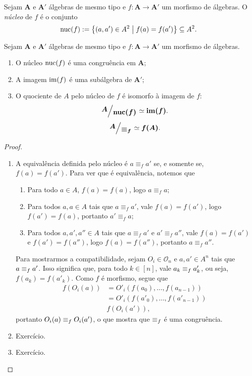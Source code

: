 \begin{definition}
Sejam $\bm A$ e $\bm A'$ álgebras de mesmo tipo e $f\colon \bm A \to \bm A'$ um morfismo de álgebras. O \emph{núcleo} de $f$ é o conjunto
		\begin{equation*}
			\operatorname{nuc}(f) := \left\{{(a,a') \in A^2}\;\middle\vert\;{f(a) = f(a')}\right\} \subseteq A^2.
		\end{equation*}
\end{definition}

\begin{proposition}
Sejam $\bm A$ e $\bm A'$ álgebras de mesmo tipo e $f\colon \bm A \to \bm A'$ um morfismo de álgebras.
	\begin{enumerate}
		\item O núcleo $\operatorname{nuc}(f)$ é uma congruência em $\bm A$;
		\item A imagem $\operatorname{im}(f)$ é uma subálgebra de $\bm A'$;
		\item O quociente de $A$ pelo núcleo de $f$ é isomorfo à imagem de $f$:
			\begin{equation*}
				\bm{\quo{A}{\nuc(f)}} \simeq \bm{\im(f)}.
			\end{equation*}
			\begin{equation*}
				\bm{\quo{A}{\congr_f}} \simeq \bm{f(A)}.
			\end{equation*}
	\end{enumerate}
\end{proposition}
\begin{proof}
	\begin{enumerate}
		\item A equivalência definida pelo núcleo é $a \equiv_f a'$ se, e somente se, $f(a)=f(a')$. Para ver que é equivalência, notemos que
		\begin{enumerate}
			\item Para todo $a \in A$, $f(a)=f(a)$, logo $a \equiv_f a$;
			\item Para todos $a,a \in A$ tais que $a \equiv_f a'$, vale $f(a)=f(a')$, logo $f(a')=f(a)$, portanto $a' \equiv_f a$;
			\item Para todos $a,a',a'' \in A$ tais que $a \equiv_f a'$ e $a' \equiv_f a''$, vale $f(a)=f(a')$ e $f(a')=f(a'')$, logo $f(a)=f(a'')$, portanto $a \equiv_f a''$.
		\end{enumerate}
		
		Para mostrarmos a compatibilidade, sejam $O_i \in \mathcal O_n$ e $a,a' \in A^n$ tais que $a \equiv_f a'$. Isso significa que, para todo $k \in [n]$, vale $a_k \equiv_f a'_k$, ou seja, $f(a_k)=f(a'_k)$. Como $f$ é morfismo, segue que
			\begin{align*}
				f(O_i(a))	&= O'_i(f(a_0),\ldots,f(a_{n-1})) \\
							&= O'_i(f(a'_0),\ldots,f(a'_{n-1})) \\
							& f(O_i(a')),
			\end{align*}
		portanto $O_i(a) \equiv_f O_i(a')$, o que mostra que $\equiv_f$ é uma congruência.

		\item Exercício.

		\item Exercício.
	\end{enumerate}
\end{proof}